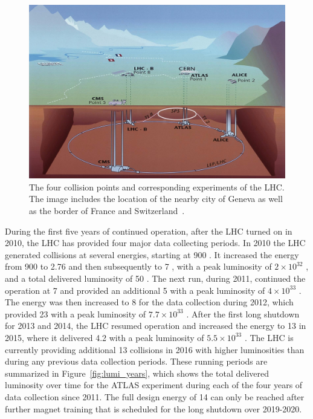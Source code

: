 \begin{figure}
\centering
\includegraphics[width=\fullfig]{figures/cern_locations.jpg}
\caption{The four collision points and corresponding experiments of the \acs*{LHC}. The image includes the location of the nearby city of Geneva as well as the border of France and Switzerland~\cite{lhcb_image}.}
\label{fig:cern_locations}
\end{figure}

During the first five years of continued operation, after the \ac{LHC} turned on in 2010, the \ac{LHC} has provided four major data collecting periods.
In 2010 the \ac{LHC} generated collisions at several energies, starting at 900 \GeV. 
It increased the energy from 900 \GeV to 2.76 \TeV and then subsequently to 7 \TeV, with a peak luminosity of $2 \times 10^{32}$ \lcms, and a total delivered luminosity of 50 \ipb.
The next run, during 2011, continued the operation at 7 \TeV and provided an additional 5 \ifb with a peak luminosity of $4 \times 10^{33}$ \lcms. 
The energy was then increased to 8 \TeV for the data collection during 2012, which provided 23 \ifb with a peak luminosity of $7.7 \times 10^{33}$ \lcms.
After the first long shutdown for 2013 and 2014, the \ac{LHC} resumed operation and increased the energy to 13 \TeV in 2015, where it delivered 4.2 \ifb with a peak luminosity of $5.5 \times 10^{33}$ \lcms. 
The \ac{LHC} is currently providing additional 13 \TeV collisions in 2016 with higher luminosities than during any previous data collection periods.
These running periods are summarized in Figure~\ref{fig:lumi_years}, which shows the total delivered luminosity over time for the ATLAS experiment during each of the four years of data collection since 2011.
The full design energy of 14 \TeV can only be reached after further magnet training that is scheduled for the long shutdown over 2019-2020.

